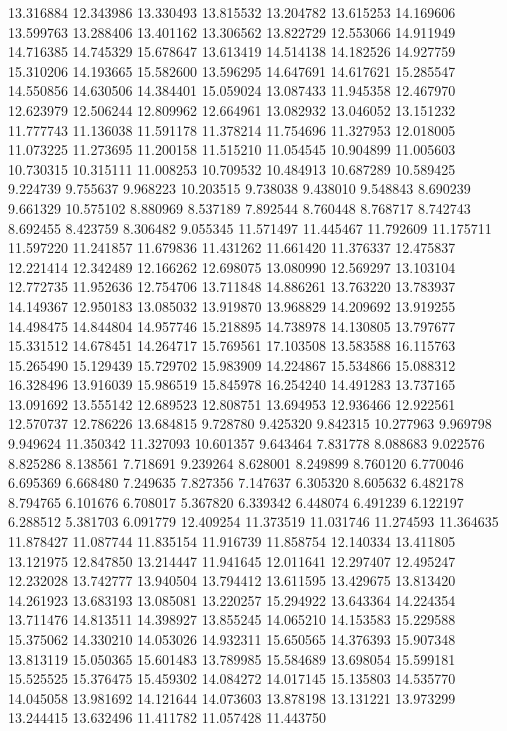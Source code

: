 13.316884
12.343986
13.330493
13.815532
13.204782
13.615253
14.169606
13.599763
13.288406
13.401162
13.306562
13.822729
12.553066
14.911949
14.716385
14.745329
15.678647
13.613419
14.514138
14.182526
14.927759
15.310206
14.193665
15.582600
13.596295
14.647691
14.617621
15.285547
14.550856
14.630506
14.384401
15.059024
13.087433
11.945358
12.467970
12.623979
12.506244
12.809962
12.664961
13.082932
13.046052
13.151232
11.777743
11.136038
11.591178
11.378214
11.754696
11.327953
12.018005
11.073225
11.273695
11.200158
11.515210
11.054545
10.904899
11.005603
10.730315
10.315111
11.008253
10.709532
10.484913
10.687289
10.589425
9.224739
9.755637
9.968223
10.203515
9.738038
9.438010
9.548843
8.690239
9.661329
10.575102
8.880969
8.537189
7.892544
8.760448
8.768717
8.742743
8.692455
8.423759
8.306482
9.055345
11.571497
11.445467
11.792609
11.175711
11.597220
11.241857
11.679836
11.431262
11.661420
11.376337
12.475837
12.221414
12.342489
12.166262
12.698075
13.080990
12.569297
13.103104
12.772735
11.952636
12.754706
13.711848
14.886261
13.763220
13.783937
14.149367
12.950183
13.085032
13.919870
13.968829
14.209692
13.919255
14.498475
14.844804
14.957746
15.218895
14.738978
14.130805
13.797677
15.331512
14.678451
14.264717
15.769561
17.103508
13.583588
16.115763
15.265490
15.129439
15.729702
15.983909
14.224867
15.534866
15.088312
16.328496
13.916039
15.986519
15.845978
16.254240
14.491283
13.737165
13.091692
13.555142
12.689523
12.808751
13.694953
12.936466
12.922561
12.570737
12.786226
13.684815
9.728780
9.425320
9.842315
10.277963
9.969798
9.949624
11.350342
11.327093
10.601357
9.643464
7.831778
8.088683
9.022576
8.825286
8.138561
7.718691
9.239264
8.628001
8.249899
8.760120
6.770046
6.695369
6.668480
7.249635
7.827356
7.147637
6.305320
8.605632
6.482178
8.794765
6.101676
6.708017
5.367820
6.339342
6.448074
6.491239
6.122197
6.288512
5.381703
6.091779
12.409254
11.373519
11.031746
11.274593
11.364635
11.878427
11.087744
11.835154
11.916739
11.858754
12.140334
13.411805
13.121975
12.847850
13.214447
11.941645
12.011641
12.297407
12.495247
12.232028
13.742777
13.940504
13.794412
13.611595
13.429675
13.813420
14.261923
13.683193
13.085081
13.220257
15.294922
13.643364
14.224354
13.711476
14.813511
14.398927
13.855245
14.065210
14.153583
15.229588
15.375062
14.330210
14.053026
14.932311
15.650565
14.376393
15.907348
13.813119
15.050365
15.601483
13.789985
15.584689
13.698054
15.599181
15.525525
15.376475
15.459302
14.084272
14.017145
15.135803
14.535770
14.045058
13.981692
14.121644
14.073603
13.878198
13.131221
13.973299
13.244415
13.632496
11.411782
11.057428
11.443750
